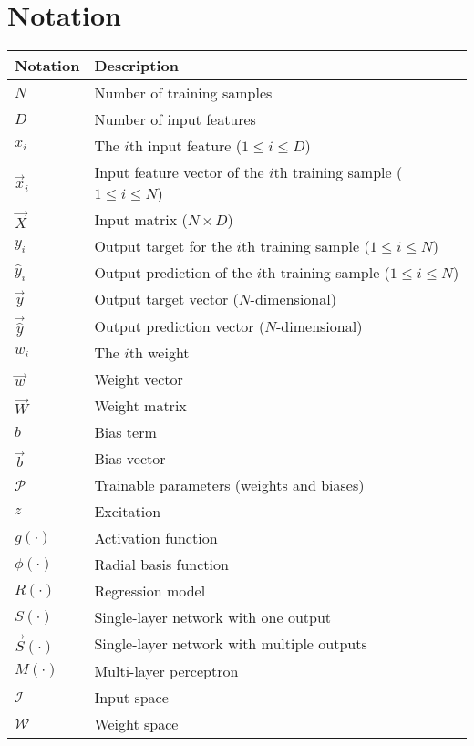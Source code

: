 \chapter*{Notation}
\begin{table}[h!]
    \centering
    \begin{tabular}{l|l}
        \hline
        Notation & Description \\
        \hline
        $N$ & Number of training samples \\
        $D$ & Number of input features \\
        $x_i$ & The $i$th input feature ($1 \leq i \leq D$) \\
        $\vec{x}_i$ & Input feature vector of the $i$th training sample ($1 \leq i \leq N$) \\
        $\vec{X}$ & Input matrix ($N \times D$) \\
        $y_i$ & Output target for the $i$th training sample ($1 \leq i \leq N$) \\
        $\hat{y}_i$ & Output prediction of the $i$th training sample ($1 \leq i \leq N$) \\
        $\vec{y}$ & Output target vector ($N$-dimensional) \\
        $\vec{\hat{y}}$ & Output prediction vector ($N$-dimensional) \\
        $w_i$ & The $i$th weight \\
        $\vec{w}$ & Weight vector \\
        $\vec{W}$ & Weight matrix \\
        $b$ & Bias term \\
        $\vec{b}$ & Bias vector \\
        $\mathscr{P}$ & Trainable parameters (weights and biases) \\
        $z$ & Excitation \\
        $g(\cdot)$ & Activation function \\
        $\phi(\cdot)$ & Radial basis function \\
        $R(\cdot)$ & Regression model \\
        $S(\cdot)$ & Single-layer network with one output \\
        $\vec{S}(\cdot)$ & Single-layer network with multiple outputs \\
        $M(\cdot)$ & Multi-layer perceptron \\
        $\mathcal{I}$ & Input space \\
        $\mathcal{W}$ & Weight space \\

\end{tabular}
\end{table}

